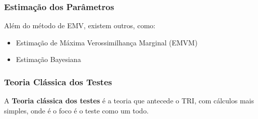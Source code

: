 \documentclass{beamer}
\begin{document}
	\begin{frame}
		
		\frametitle{Estimação dos Parâmetros }
		
		Além do método de EMV, existem outros, como:
		
		\begin{itemize}
			
			\item Estimação de Máxima Verossimilhança Marginal (EMVM)
			
			\item Estimação Bayesiana
			
		\end{itemize}
		
	
		
	\end{frame}
	\begin{comment}
		conteúdo...\begin{frame}
			
			\frametitle{Estimação dos Parâmetros }
			
			
			\begin{block}{Estimação Bayesiana}
				
				A abordagem bayesiana é usada para estimar os parâmetros da TRI com base na distribuição \textit{a priori} dos parâmetros. Ela incorpora informações prévias sobre os parâmetros e atualiza essas informações com base nas respostas dos participantes.\\ 
				
			\end{block}
			
		\end{frame}
	\end{comment}
	
	\begin{frame}
		
		\frametitle{Teoria Clássica dos Testes}
		
		A \textbf{Teoria clássica dos testes} é a teoria que antecede o TRI, 
		com cálculos mais simples, onde é o foco é o teste como um todo.
		
	\end{frame}		
	
\end{document}
